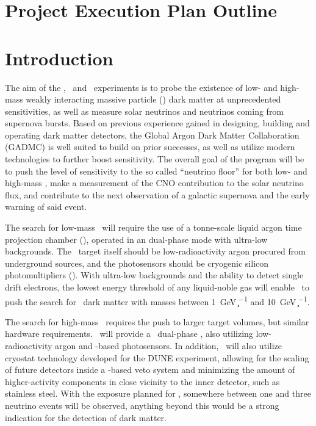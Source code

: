 \section*{Project Execution Plan Outline}

\section{Introduction}

The aim of the \DSls, \DSks\ and \Argo\ experiments is to probe the existence of low- and high-mass weakly interacting massive particle (\WIMP) dark matter at unprecedented sensitivities, as well as measure solar neutrinos and neutrinos coming from supernova bursts.  Based on previous experience gained in designing, building and operating dark matter detectors, the Global Argon Dark Matter Collaboration (GADMC) is well suited to build on prior successes, as well as utilize modern technologies to further boost sensitivity.  The overall goal of the program will be to push the level of sensitivity to the so called ``neutrino floor'' for both low- and high-mass \WIMPs, make a measurement of the CNO contribution to the solar neutrino flux, and contribute to the next observation of a galactic supernova and the early warning of said event.

The search for low-mass \WIMPs\ will require the use of a tonne-scale liquid argon time projection chamber (\LArTPC), operated in an dual-phase mode with ultra-low backgrounds.  The \LAr\ target itself should be low-radioactivity argon procured from underground sources, and the photosensors should be cryogenic silicon photomultipliers (\SiPMs).  With ultra-low backgrounds and the ability to detect single drift electrons, the lowest energy threshold of any liquid-noble gas will enable \DSls\ to push the search for \WIMP\ dark matter with masses between \SI{1}{\GeV\per\c\squared} and \SI{10}{\GeV\per\c\squared}.  

The search for high-mass \WIMPs\ requires the push to larger target volumes, but similar hardware requirements.  \DSks\ will provide a \DSkFiducialMass\ dual-phase \LArTPC, also utilizing low-radioactivity argon and \SiPM-based photosensors.  In addition, \DSks\ will also utilize cryostat technology developed for the DUNE experiment, allowing for the scaling of future detectors inside a \LAr-based veto system and minimizing the amount of higher-activity components in close vicinity to the inner detector, such as stainless steel.  With the exposure planned for \DSk, somewhere between one and three neutrino events will be observed, anything beyond this would be a strong indication for the detection of dark matter.  

